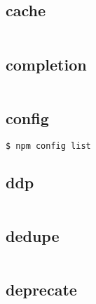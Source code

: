 \begin{lstlisting}[language=bash]

\end{lstlisting}

\subsection{cache}


\begin{lstlisting}[language=bash]

\end{lstlisting}

\subsection{completion}



\begin{lstlisting}[language=bash]

\end{lstlisting}

\subsection{config}


\begin{lstlisting}[language=bash]
$ npm config list

\end{lstlisting}

\subsection{ddp}


\begin{lstlisting}[language=bash]

\end{lstlisting}

\subsection{dedupe}



\begin{lstlisting}[language=bash]

\end{lstlisting}

\subsection{deprecate}




